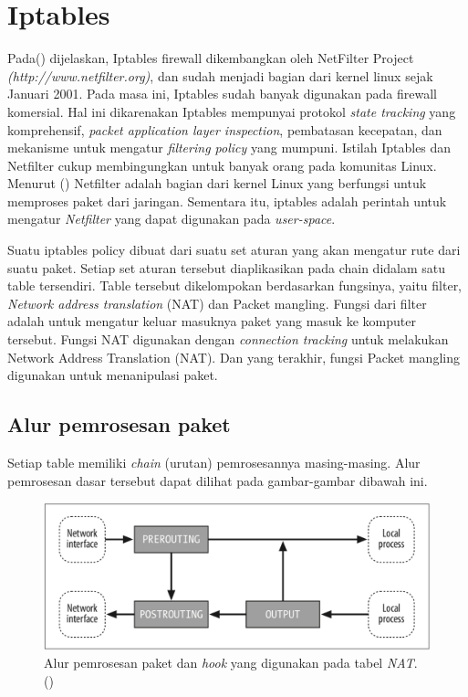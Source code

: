 \section{Iptables}
Pada(\cite{rash2007linux}) dijelaskan, Iptables firewall dikembangkan oleh NetFilter Project \textit{(http://www.netfilter.org)}, dan sudah menjadi bagian dari kernel linux sejak Januari 2001.  Pada masa ini, Iptables sudah banyak digunakan pada firewall komersial. Hal ini dikarenakan Iptables mempunyai protokol \textit{state tracking} yang komprehensif, \textit{packet application layer inspection}, pembatasan kecepatan, dan mekanisme untuk mengatur \textit{filtering policy} yang mumpuni. 
Istilah Iptables dan Netfilter cukup membingungkan untuk banyak orang pada komunitas Linux. Menurut (\cite{purdy2004linux}) Netfilter adalah bagian dari kernel Linux yang berfungsi untuk memproses paket dari jaringan. Sementara itu,  iptables adalah perintah untuk mengatur \textit{Netfilter} yang dapat digunakan pada \textit{user-space}. 

Suatu iptables policy dibuat dari suatu set aturan yang akan mengatur rute dari suatu paket. Setiap set aturan tersebut diaplikasikan pada chain didalam satu table tersendiri. Table tersebut dikelompokan berdasarkan fungsinya, yaitu filter, \textit{Network address translation} (NAT) dan Packet mangling. Fungsi dari filter adalah untuk mengatur keluar masuknya paket yang masuk ke komputer tersebut. Fungsi NAT digunakan dengan \textit{connection tracking} untuk melakukan Network Address Translation (NAT). Dan yang terakhir, fungsi Packet mangling digunakan untuk menanipulasi paket.

\subsection{Alur pemrosesan paket}
Setiap table memiliki \textit{chain} (urutan) pemrosesannya masing-masing. Alur pemrosesan dasar tersebut dapat dilihat pada gambar-gambar dibawah ini.
\begin{figure}[H]
	\centering
	\includegraphics[width=\textwidth]{resources/nat_table.png}
	\caption{Alur pemrosesan paket dan \textit{hook} yang digunakan pada tabel \textit{NAT}. (\cite{purdy2004linux})}
	\label{fig:packetflow_NAT}
\end{figure}

